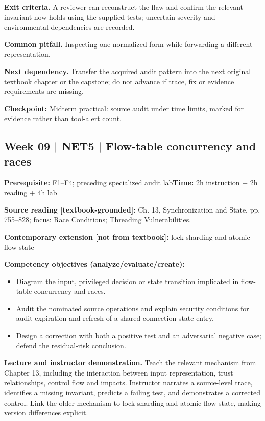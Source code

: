 \documentclass[10pt,letterpaper]{article}
\begin{document}
\textbf{Exit criteria.} A reviewer can reconstruct the flaw and confirm the relevant invariant now holds using the supplied tests; uncertain severity and environmental dependencies are recorded.

\textbf{Common pitfall.} Inspecting one normalized form while forwarding a different representation.

\textbf{Next dependency.} Transfer the acquired audit pattern into the next original textbook chapter or the capstone; do not advance if trace, fix or evidence requirements are missing.

\begin{historynote}\textbf{Checkpoint:} Midterm practical: source audit under time limits, marked for evidence rather than tool-alert count.\end{historynote}
\subsection{Week 09 | NET5 | Flow-table concurrency and races}
\textbf{Prerequisite:} F1--F4; preceding specialized audit lab\hfill\textbf{Time:} 2h instruction + 2h reading + 4h lab

\textbf{Source reading [textbook-grounded]:} Ch. 13, Synchronization and State, pp. 755--828; focus: Race Conditions; Threading Vulnerabilities.

\textbf{Contemporary extension [not from textbook]:} lock sharding and atomic flow state

\textbf{Competency objectives (analyze/evaluate/create):}
\begin{itemize}[leftmargin=*,itemsep=2pt]
\item Diagram the input, privileged decision or state transition implicated in flow-table concurrency and races.
\item Audit the nominated source operations and explain security conditions for audit expiration and refresh of a shared connection-state entry.
\item Design a correction with both a positive test and an adversarial negative case; defend the residual-risk conclusion.
\end{itemize}
\textbf{Lecture and instructor demonstration.} Teach the relevant mechanism from Chapter 13, including the interaction between input representation, trust relationships, control flow and impacts. Instructor narrates a source-level trace, identifies a missing invariant, predicts a failing test, and demonstrates a corrected control. Link the older mechanism to lock sharding and atomic flow state, making version differences explicit.
\end{document}
